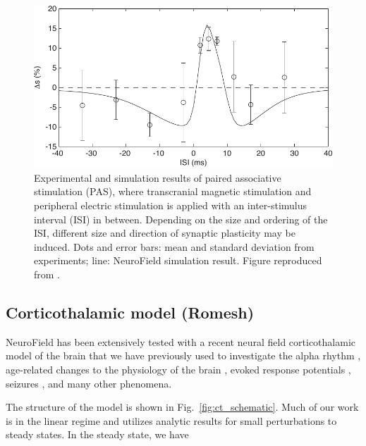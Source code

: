 \documentclass[preprint,review,10pt,authoryear,letterpaper]{elsarticle}
\begin{document}
\begin{figure}[t]
\begin{center}
\includegraphics[width=.8\textwidth]{window}
\caption{Experimental and simulation results of paired associative stimulation (PAS), where transcranial magnetic stimulation and peripheral electric stimulation is applied with an inter-stimulus interval (ISI) in between. Depending on the size and ordering of the ISI, different size and direction of synaptic plasticity may be induced. Dots and error bars: mean and standard deviation from experiments; line: NeuroField simulation result. Figure reproduced from \citet{fung13}.}
\label{fig:cadp-window}
\end{center}
\end{figure}

\subsection{Corticothalamic model (Romesh)}
\label{sec:ct}

NeuroField has been extensively tested with a recent neural field corticothalamic model of the brain \citep{Robinson2005,Rowe2004413,PhysRevE.63.021903,PhysRevE.65.041924,Robinson:04aa} that we have previously used to investigate the alpha rhythm \citep{PhysRevE.68.021922,PhysRevE.70.011911}, age-related changes to the physiology of the brain \citep{VanAlbada2010}, evoked response potentials \citep{Rennie2002,ker11}, seizures \citep{Breakspear2006}, and many other phenomena. 

The structure of the model is shown in Fig.~\ref{fig:ct_schematic}. Much of our work is in the linear regime and utilizes analytic results for small perturbations to steady states. In the steady state, we have
\end{document}
